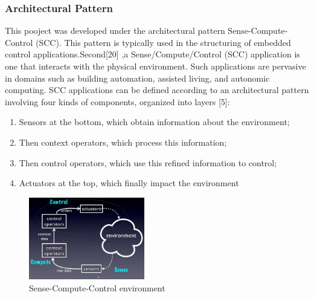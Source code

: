 \documentclass{acm_proc_article-sp}
\begin{document}
\subsubsection{Architectural Pattern}
This pooject was developed under the architectural pattern Sense-Compute-Control (SCC). This pattern is typically used in the structuring of embedded control applications.Second[20] ,a Sense/Compute/Control (SCC) application is one that interacts with the physical environment. Such applications are pervasive in domains such as building automation, assisted living, and autonomic computing. SCC applications can be defined according to an architectural pattern involving four kinds of components, organized into layers [5]: 
\begin{enumerate}
\item Sensors at the bottom, which obtain information about the environment; 
\item Then context operators, which process this information; 
\item Then control operators, which use this refined information to control;
\item Actuators at the top, which finally impact the environment
\end{enumerate}


\begin{figure}[h]
    \includegraphics[width=0.45\textwidth,natwidth=610,natheight=642]{pictures/senseComputeControl.png}
    \caption{Sense-Compute-Control environment}
    \label{fig:scc}
\end{figure}
\end{document}
